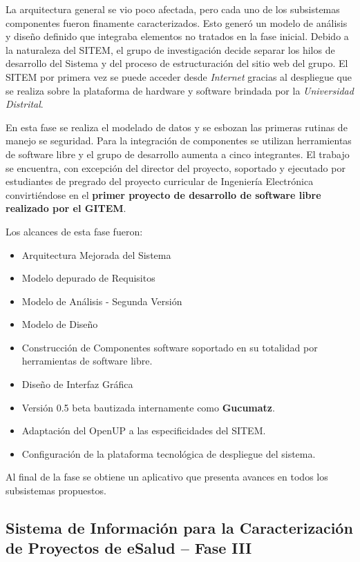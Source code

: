 La arquitectura general se vio poco afectada, pero cada uno de los subsistemas componentes fueron finamente caracterizados. Esto generó un modelo de análisis y diseño definido que integraba elementos no tratados en la fase inicial. Debido a la naturaleza del SITEM, el grupo de investigación decide separar los hilos de desarrollo del Sistema y del proceso de estructuración del sitio web del grupo. El SITEM por primera vez se puede acceder desde \textit{Internet} gracias al despliegue que se realiza sobre la plataforma de hardware y software brindada por la \textit{Universidad Distrital}. 

En esta fase se realiza el modelado de datos y se esbozan las primeras rutinas de manejo se seguridad. Para la integración de componentes se utilizan herramientas de software libre y el grupo de desarrollo aumenta a cinco integrantes. El trabajo se encuentra, con excepción del director del proyecto, soportado y ejecutado por estudiantes de pregrado del proyecto curricular de Ingeniería Electrónica convirtiéndose en el \textbf{primer proyecto de desarrollo de software libre realizado por el GITEM}.

Los alcances de esta fase fueron:
\begin{itemize}
\item Arquitectura Mejorada del Sistema
\item Modelo depurado de Requisitos
\item Modelo de Análisis - Segunda Versión
\item Modelo de Diseño
\item Construcción de Componentes software soportado en su totalidad por herramientas de software libre.
\item Diseño de Interfaz Gráfica
\item Versión 0.5 beta bautizada internamente como \textbf{Gucumatz}.
\item Adaptación del OpenUP a las especificidades del SITEM.
\item Configuración de la plataforma tecnológica de despliegue del sistema.
\end{itemize}

Al final de la fase se obtiene un aplicativo que presenta avances en todos los subsistemas propuestos.


\subsection{Sistema de Información para la Caracterización de Proyectos de eSalud – Fase III}

